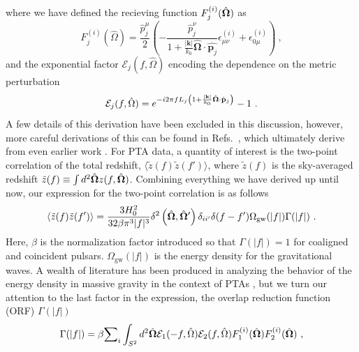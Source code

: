 \documentclass[prd,aps,psfig,nofootinbib,nobibnotes,superscriptaddress,preprintnumbers,times]{revtex4-2}\setlength{\topmargin}{-14mm}
\begin{document}
where we have defined the recieving function $F^{(i)}_j(\hat{\bf \Omega}) $ as 
\begin{equation}\label{eqn:recieving}
    F^{(i)}_j(\hat{\Omega}) = \frac{\hat{p}^\mu_j}{2}\left(-\frac{\hat{p}^\nu_j}{1+\frac{|\boldsymbol{k}|}{k_0} \hat{\boldsymbol{\Omega}} \cdot \hat{\boldsymbol{p}_j}} \epsilon_{\mu \nu}^{(i)}+\epsilon_{0 \mu}^{(i)}\right) \ ,
\end{equation}
and the exponential factor $\mathcal{E}_j(f, \hat{\Omega})$ encoding the dependence on the metric perturbation
\begin{equation}
    \mathcal{E}_j(f, \hat{\Omega}) = e^{-i2\pi f L_j\left( 1 + \frac{|{\bf k}|}{k_0} \hat{\bf \Omega}\cdot \hat{\bf p}_j\right)} - 1 \ . 
\end{equation}
A few details of this derivation have been excluded in this discussion, however, more careful derivations of this can be found in Refs.\ \cite{Anholm:2008wy, Liang:2021bct}, which ultimately derive from even earlier work \cite{Detweiler:1979wn, Estabrook:1975jtn, Kaufmann:1970}.
For PTA data, a quantity of interest is the two-point correlation of the total redshift, $\langle \tilde{z}(f) \tilde{z}(f') \rangle$, where $\tilde{z}(f)$ is the sky-averaged redshift $\tilde{z}(f) \equiv \int d^2\hat{\bf \Omega} z(f, \hat{\bf \Omega})$. Combining everything we have derived up until now, our expression for the two-point correlation is as follows
\begin{equation}\label{eqn:two_point_z}
    \langle \tilde{z}(f) \tilde{z}(f') \rangle = \frac{3H_0^2}{32 \beta \pi^3|f|^3}\delta^2\left(\hat{\bf \Omega} , \hat{\bf \Omega}'\right)\delta_{ii'}\delta(f - f')\Omega_{\text{gw}}(|f|) \Gamma(|f|) \ .
\end{equation}
Here, $\beta$ is the normalization factor introduced so that $\Gamma(|f|) = 1$ for coaligned and coincident pulsars. $\Omega_{\text{gw}}(|f|)$ is the energy density for the gravitational waves. A wealth of literature has been produced in analyzing the behavior of the energy density in massive gravity in the context of PTAs \cite{Choi:2023tun, Wu:2023rib, Kenjale:2024rsc, He:2021bqm}, but we turn our attention to the last factor in the expression, the overlap reduction function (ORF) $\Gamma(|f|)$ 
\begin{equation}\label{eq:orf_full}
    \Gamma(|f|) = \beta {\sum}_i \int_{S^2} d^2 \hat{\bf{\Omega}} \mathcal{E}_1(-f, \hat{\Omega}) \mathcal{E}_2(f, \hat{\Omega}) F_1^{(i)}(\hat{\bf{\Omega}}) F_2^{(i)}(\hat{\bf{\Omega}}) \ ,
\end{equation}
\end{document}
